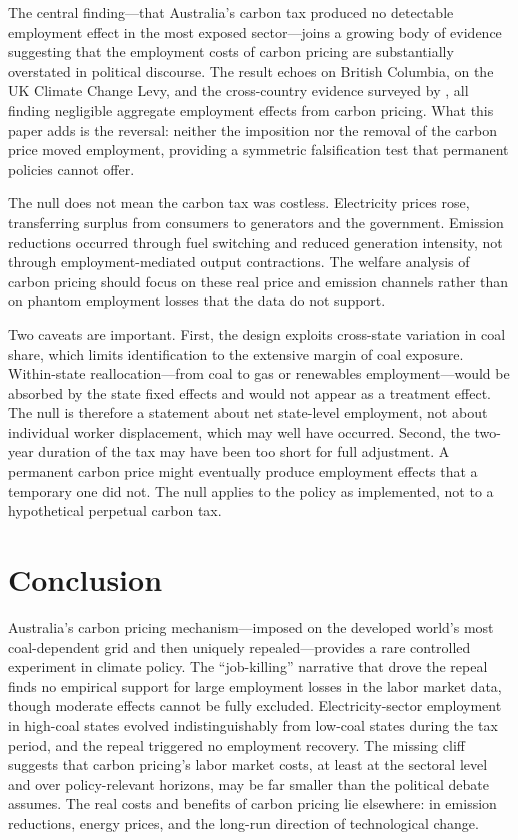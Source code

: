 \documentclass[12pt]{article}
\begin{document}
The central finding---that Australia's carbon tax produced no detectable employment effect in the most exposed sector---joins a growing body of evidence suggesting that the employment costs of carbon pricing are substantially overstated in political discourse. The result echoes \citet{yamazaki2017jobs} on British Columbia, \citet{martin2016anatomy} on the UK Climate Change Levy, and the cross-country evidence surveyed by \citet{koppl2023carbon}, all finding negligible aggregate employment effects from carbon pricing. What this paper adds is the reversal: neither the imposition nor the removal of the carbon price moved employment, providing a symmetric falsification test that permanent policies cannot offer.

The null does not mean the carbon tax was costless. Electricity prices rose, transferring surplus from consumers to generators and the government. Emission reductions occurred through fuel switching and reduced generation intensity, not through employment-mediated output contractions. The welfare analysis of carbon pricing should focus on these real price and emission channels rather than on phantom employment losses that the data do not support.

Two caveats are important. First, the design exploits cross-state variation in coal share, which limits identification to the extensive margin of coal exposure. Within-state reallocation---from coal to gas or renewables employment---would be absorbed by the state fixed effects and would not appear as a treatment effect. The null is therefore a statement about net state-level employment, not about individual worker displacement, which may well have occurred. Second, the two-year duration of the tax may have been too short for full adjustment. A permanent carbon price might eventually produce employment effects that a temporary one did not. The null applies to the policy as implemented, not to a hypothetical perpetual carbon tax.

\section{Conclusion}

Australia's carbon pricing mechanism---imposed on the developed world's most coal-dependent grid and then uniquely repealed---provides a rare controlled experiment in climate policy. The ``job-killing'' narrative that drove the repeal finds no empirical support for large employment losses in the labor market data, though moderate effects cannot be fully excluded. Electricity-sector employment in high-coal states evolved indistinguishably from low-coal states during the tax period, and the repeal triggered no employment recovery. The missing cliff suggests that carbon pricing's labor market costs, at least at the sectoral level and over policy-relevant horizons, may be far smaller than the political debate assumes. The real costs and benefits of carbon pricing lie elsewhere: in emission reductions, energy prices, and the long-run direction of technological change.
\end{document}
